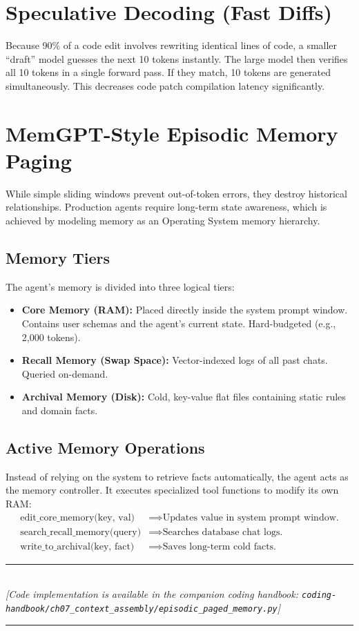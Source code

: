 \section{Speculative Decoding (Fast Diffs)}

Because 90\% of a code edit involves rewriting identical lines of code, a smaller ``draft'' model guesses the next 10 tokens instantly. The large model then verifies all 10 tokens in a single forward pass. If they match, 10 tokens are generated simultaneously. This decreases code patch compilation latency significantly.

\section{MemGPT-Style Episodic Memory Paging}

While simple sliding windows prevent out-of-token errors, they destroy historical relationships. Production agents require long-term state awareness, which is achieved by modeling memory as an Operating System memory hierarchy.

\subsection{Memory Tiers}
The agent's memory is divided into three logical tiers:
\begin{itemize}
    \item \textbf{Core Memory (RAM):} Placed directly inside the system prompt window. Contains user schemas and the agent's current state. Hard-budgeted (e.g., 2,000 tokens).
    \item \textbf{Recall Memory (Swap Space):} Vector-indexed logs of all past chats. Queried on-demand.
    \item \textbf{Archival Memory (Disk):} Cold, key-value flat files containing static rules and domain facts.
\end{itemize}

\subsection{Active Memory Operations}
Instead of relying on the system to retrieve facts automatically, the agent acts as the memory controller. It executes specialized tool functions to modify its own RAM:
\begin{align}
\text{edit\_core\_memory(key, val)} &\implies \text{Updates value in system prompt window.} \\
\text{search\_recall\_memory(query)} &\implies \text{Searches database chat logs.} \\
\text{write\_to\_archival(key, fact)} &\implies \text{Saves long-term cold facts.}
\end{align}

\begin{center}
\noindent\rule{0.6\textwidth}{0.4pt} \\
\vspace{0.3em}
\textit{[Code implementation is available in the companion coding handbook: \texttt{coding-handbook/ch07\_context\_assembly/episodic\_paged\_memory.py}]} \\
\noindent\rule{0.6\textwidth}{0.4pt}
\end{center}

